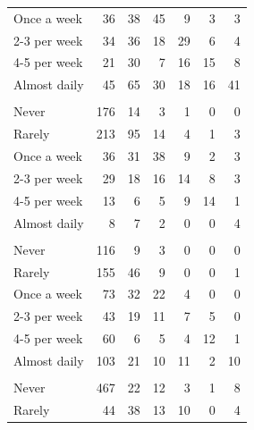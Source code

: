 \documentclass[]{elsarticle} %
\begin{document}
\begin{table}
{\begin{tabular}[t]{lrrrrrr}
\hspace{1em}Once a week & 36 & 38 & 45 & 9 & 3 & 3\\
\hspace{1em}2-3 per week & 34 & 36 & 18 & 29 & 6 & 4\\
\hspace{1em}4-5 per week & 21 & 30 & 7 & 16 & 15 & 8\\
\hspace{1em}Almost daily & 45 & 65 & 30 & 18 & 16 & 41\\
\addlinespace[0.3em]
\multicolumn{7}{l}{\textbf{cng auto-rickshaw}}\\
\hspace{1em}Never & 176 & 14 & 3 & 1 & 0 & 0\\
\hspace{1em}Rarely & 213 & 95 & 14 & 4 & 1 & 3\\
\hspace{1em}Once a week & 36 & 31 & 38 & 9 & 2 & 3\\
\hspace{1em}2-3 per week & 29 & 18 & 16 & 14 & 8 & 3\\
\hspace{1em}4-5 per week & 13 & 6 & 5 & 9 & 14 & 1\\
\hspace{1em}Almost daily & 8 & 7 & 2 & 0 & 0 & 4\\
\addlinespace[0.3em]
\multicolumn{7}{l}{\textbf{bus}}\\
\hspace{1em}Never & 116 & 9 & 3 & 0 & 0 & 0\\
\hspace{1em}Rarely & 155 & 46 & 9 & 0 & 0 & 1\\
\hspace{1em}Once a week & 73 & 32 & 22 & 4 & 0 & 0\\
\hspace{1em}2-3 per week & 43 & 19 & 11 & 7 & 5 & 0\\
\hspace{1em}4-5 per week & 60 & 6 & 5 & 4 & 12 & 1\\
\hspace{1em}Almost daily & 103 & 21 & 10 & 11 & 2 & 10\\
\addlinespace[0.3em]
\multicolumn{7}{l}{\textbf{motorcycle}}\\
\hspace{1em}Never & 467 & 22 & 12 & 3 & 1 & 8\\
\hspace{1em}Rarely & 44 & 38 & 13 & 10 & 0 & 4\\

\end{tabular}}
\end{table}
\end{document}
